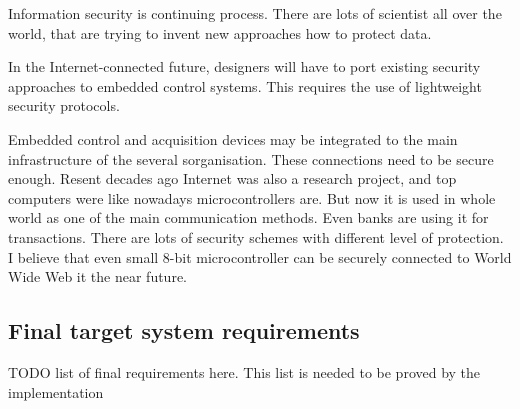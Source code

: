 Information security is continuing process. There are lots of scientist all
over the world, that are trying to invent new approaches how to protect data.

In the Internet-connected future, designers will have to port existing
security approaches to embedded control systems. This requires the use of 
lightweight security protocols.

Embedded control and acquisition devices may be integrated to the main
infrastructure of the several sorganisation. These connections need to be secure
enough.
Resent decades ago Internet was also a research project, and top computers were
like nowadays microcontrollers are. But now it is used in whole world as one of
the main communication methods. Even banks are using it for transactions. There are
lots of security schemes with different level of protection. I believe that
even small 8-bit microcontroller can be securely connected to World Wide Web it
the near future.




\subsection{Final target system requirements}
TODO list of final requirements here. This list is needed to be proved by the
implementation
